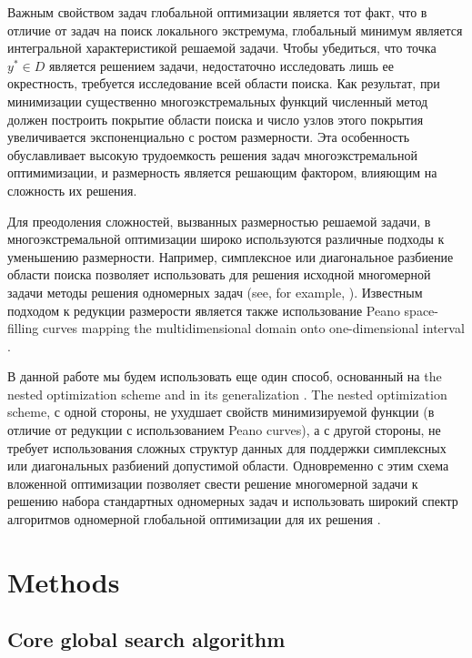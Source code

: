 \documentclass[entropy,article,submit,moreauthors,pdftex]{Definitions/mdpi}
\begin{document}
Важным свойством задач глобальной оптимизации является тот факт, что в отличие от задач на поиск локального экстремума, глобальный минимум является интегральной характеристикой решаемой задачи. Чтобы убедиться, что точка $y^*\in D$ является решением задачи, недостаточно исследовать лишь ее окрестность, требуется исследование всей области поиска. Как результат, при минимизации существенно многоэкстремальных функций численный метод должен построить покрытие области поиска и число узлов этого покрытия увеличивается экспоненциально с ростом размерности. 
Эта особенность обуславливает высокую трудоемкость решения задач многоэкстремальной оптимимизации, и размерность является решающим фактором, влияющим на сложность их решения. 

Для преодоления сложностей, вызванных размерностью решаемой задачи, в многоэкстремальной оптимизации широко используются различные подходы к уменьшению размерности.  
Например, симплексное или диагональное разбиение области поиска позволяет использовать для решения исходной многомерной задачи методы решения одномерных задач (see, for example, \cite{PaulaviciusZilinskas2014,Sergeyev2017,Sergeyev2013}). 
Известным подходом к редукции размерости является также использование Peano space-filling curves mapping the multidimensional domain onto one-dimensional interval \cite{Strongin2000}.

В данной работе мы будем использовать еще один способ, основанный на the nested optimization scheme \cite{Shi2000,Grishagin2001,VanDam2010,Grishagin2015} and in its generalization \cite{Grishagin2016,Grishagin2016_1}.
The nested optimization scheme, с одной стороны, не ухудшает свойств минимизируемой функции (в отличие от редукции с использованием Peano curves), а с другой стороны, не требует использования сложных структур данных для поддержки симплексных или диагональных разбиений допустимой области. 
Одновременно с этим схема вложенной оптимизации позволяет свести решение многомерной задачи к решению набора стандартных одномерных задач и использовать широкий спектр алгоритмов одномерной глобальной оптимизации для их решения \cite{}.

\section{Methods}

\subsection{Core global search algorithm}\label{CoreGSA}
\end{document}
